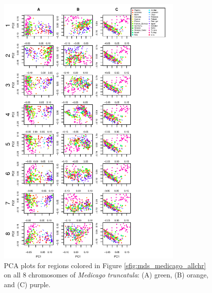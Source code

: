 \documentclass[11pt, oneside]{article}   	%
\begin{document}
\begin{figure}
    \begin{center}
       \includegraphics[width=0.82\textwidth]{FigS_pca_plots_for_Medicago_allchr_3peaks_byMDS}
    \end{center}
    \caption{
        PCA plots for regions colored in Figure \ref{sfig:mds_medicago_allchr}
        on all 8 chromosomes of \textit{Medicago truncatula}:
        (A) green, (B) orange, and (C) purple.
        \label{sfig:pca_peaks_medicago_allchr}
    }
\end{figure}
\end{document}
